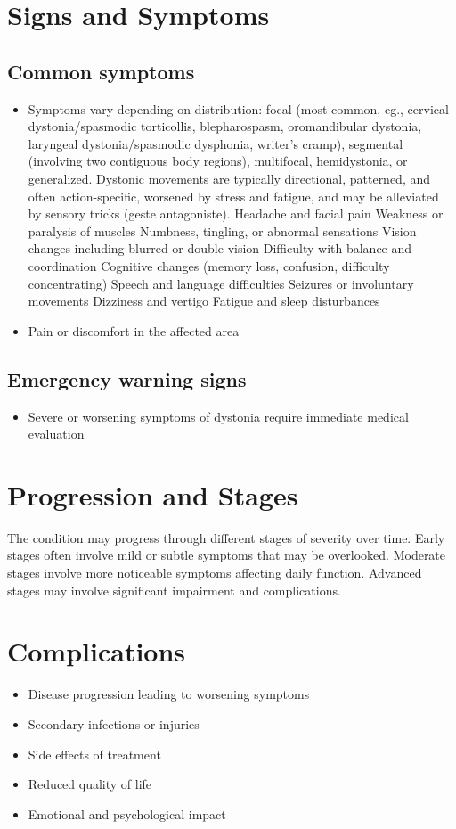 \section{Signs and Symptoms}
\subsection{Common symptoms}
\begin{itemize}[noitemsep]
  \item Symptoms vary depending on distribution: focal (most common, eg., cervical dystonia/spasmodic torticollis, blepharospasm, oromandibular dystonia, laryngeal dystonia/spasmodic dysphonia, writer's cramp), segmental (involving two contiguous body regions), multifocal, hemidystonia, or generalized. Dystonic movements are typically directional, patterned, and often action-specific, worsened by stress and fatigue, and may be alleviated by sensory tricks (geste antagoniste). Headache and facial pain Weakness or paralysis of muscles Numbness, tingling, or abnormal sensations Vision changes including blurred or double vision Difficulty with balance and coordination Cognitive changes (memory loss, confusion, difficulty concentrating) Speech and language difficulties Seizures or involuntary movements Dizziness and vertigo Fatigue and sleep disturbances
  \item Pain or discomfort in the affected area
  \end{itemize}
\subsection{Emergency warning signs}
\begin{itemize}[noitemsep]
  \item Severe or worsening symptoms of dystonia require immediate medical evaluation
\end{itemize}
\section{Progression and Stages}
The condition may progress through different stages of severity over time. Early stages often involve mild or subtle symptoms that may be overlooked. Moderate stages involve more noticeable symptoms affecting daily function. Advanced stages may involve significant impairment and complications.
\section{Complications}
\begin{itemize}[noitemsep]
  \item Disease progression leading to worsening symptoms
  \item Secondary infections or injuries
  \item Side effects of treatment
  \item Reduced quality of life
  \item Emotional and psychological impact
\end{itemize}
